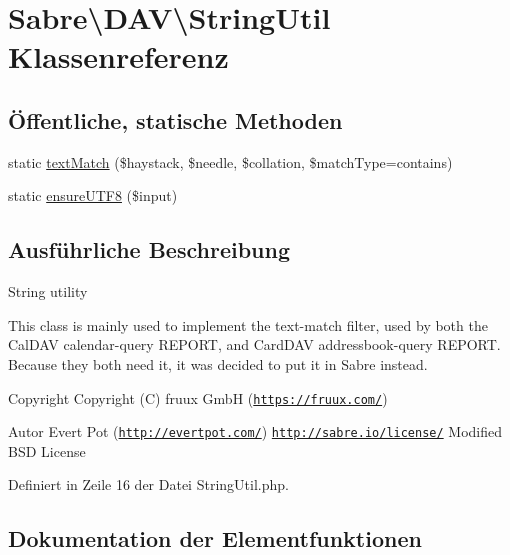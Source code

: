 \hypertarget{class_sabre_1_1_d_a_v_1_1_string_util}{}\section{Sabre\textbackslash{}D\+AV\textbackslash{}String\+Util Klassenreferenz}
\label{class_sabre_1_1_d_a_v_1_1_string_util}
\subsection*{Öffentliche, statische Methoden}
\begin{DoxyCompactItemize}
\item 
static \mbox{\hyperlink{class_sabre_1_1_d_a_v_1_1_string_util_a460ccddb1d59d9119e571aba5cf91278}{text\+Match}} (\$haystack, \$needle, \$collation, \$match\+Type=\textquotesingle{}contains\textquotesingle{})
\item 
static \mbox{\hyperlink{class_sabre_1_1_d_a_v_1_1_string_util_a773e2aa880fb6286ae9ed9974c84c050}{ensure\+U\+T\+F8}} (\$input)
\end{DoxyCompactItemize}


\subsection{Ausführliche Beschreibung}
String utility

This class is mainly used to implement the \textquotesingle{}text-\/match\textquotesingle{} filter, used by both the Cal\+D\+AV calendar-\/query R\+E\+P\+O\+RT, and Card\+D\+AV addressbook-\/query R\+E\+P\+O\+RT. Because they both need it, it was decided to put it in Sabre instead.

\begin{DoxyCopyright}{Copyright}
Copyright (C) fruux GmbH (\href{https://fruux.com/}{\tt https\+://fruux.\+com/}) 
\end{DoxyCopyright}
\begin{DoxyAuthor}{Autor}
Evert Pot (\href{http://evertpot.com/}{\tt http\+://evertpot.\+com/})  \href{http://sabre.io/license/}{\tt http\+://sabre.\+io/license/} Modified B\+SD License 
\end{DoxyAuthor}


Definiert in Zeile 16 der Datei String\+Util.\+php.



\subsection{Dokumentation der Elementfunktionen}
\mbox{\label{class_sabre_1_1_d_a_v_1_1_string_util_a773e2aa880fb6286ae9ed9974c84c050}} 
